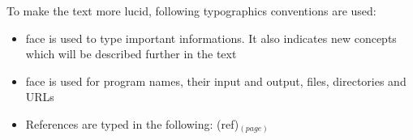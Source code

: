 To make the text more lucid, following typographics conventions are used:
\begin{itemize}
\item {} face is used to type important informations. It also indicates new concepts which will be described further in the text
\item {} face is used for program names, their input and output, files, directories and URLs
\item References are typed in the following: (ref)$_{(page)}$
\end{itemize}